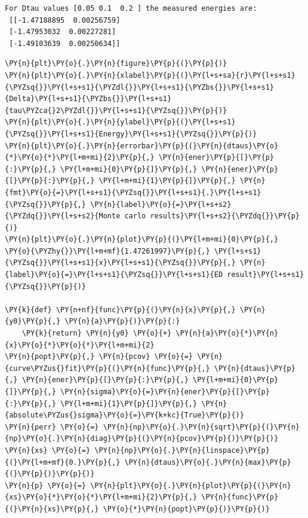     \begin{Verbatim}[commandchars=\\\{\}]
For Dtau values [0.05 0.1  0.2 ] the measured energies are:
 [[-1.47188895  0.00256759]
 [-1.47953032  0.00227281]
 [-1.49103639  0.00250634]]
    \end{Verbatim}

    \begin{tcolorbox}[breakable, size=fbox, boxrule=1pt, pad at break*=1mm,colback=cellbackground, colframe=cellborder]
\begin{Verbatim}[commandchars=\\\{\}]
\PY{n}{plt}\PY{o}{.}\PY{n}{figure}\PY{p}{(}\PY{p}{)}
\PY{n}{plt}\PY{o}{.}\PY{n}{xlabel}\PY{p}{(}\PY{l+s+sa}{r}\PY{l+s+s1}{\PYZsq{}}\PY{l+s+s1}{\PYZdl{}}\PY{l+s+s1}{\PYZbs{}}\PY{l+s+s1}{Delta}\PY{l+s+s1}{\PYZbs{}}\PY{l+s+s1}{tau\PYZca{}2\PYZdl{}}\PY{l+s+s1}{\PYZsq{}}\PY{p}{)}
\PY{n}{plt}\PY{o}{.}\PY{n}{ylabel}\PY{p}{(}\PY{l+s+s1}{\PYZsq{}}\PY{l+s+s1}{Energy}\PY{l+s+s1}{\PYZsq{}}\PY{p}{)}
\PY{n}{plt}\PY{o}{.}\PY{n}{errorbar}\PY{p}{(}\PY{n}{dtaus}\PY{o}{*}\PY{o}{*}\PY{l+m+mi}{2}\PY{p}{,} \PY{n}{ener}\PY{p}{[}\PY{p}{:}\PY{p}{,} \PY{l+m+mi}{0}\PY{p}{]}\PY{p}{,} \PY{n}{ener}\PY{p}{[}\PY{p}{:}\PY{p}{,} \PY{l+m+mi}{1}\PY{p}{]}\PY{p}{,} \PY{n}{fmt}\PY{o}{=}\PY{l+s+s1}{\PYZsq{}}\PY{l+s+s1}{.}\PY{l+s+s1}{\PYZsq{}}\PY{p}{,} \PY{n}{label}\PY{o}{=}\PY{l+s+s2}{\PYZdq{}}\PY{l+s+s2}{Monte carlo results}\PY{l+s+s2}{\PYZdq{}}\PY{p}{)}
\PY{n}{plt}\PY{o}{.}\PY{n}{plot}\PY{p}{(}\PY{l+m+mi}{0}\PY{p}{,} \PY{o}{\PYZhy{}}\PY{l+m+mf}{1.47261997}\PY{p}{,} \PY{l+s+s1}{\PYZsq{}}\PY{l+s+s1}{x}\PY{l+s+s1}{\PYZsq{}}\PY{p}{,} \PY{n}{label}\PY{o}{=}\PY{l+s+s1}{\PYZsq{}}\PY{l+s+s1}{ED result}\PY{l+s+s1}{\PYZsq{}}\PY{p}{)}

\PY{k}{def} \PY{n+nf}{func}\PY{p}{(}\PY{n}{x}\PY{p}{,} \PY{n}{y0}\PY{p}{,} \PY{n}{a}\PY{p}{)}\PY{p}{:}
    \PY{k}{return} \PY{n}{y0} \PY{o}{+} \PY{n}{a}\PY{o}{*}\PY{n}{x}\PY{o}{*}\PY{o}{*}\PY{l+m+mi}{2}
\PY{n}{popt}\PY{p}{,} \PY{n}{pcov} \PY{o}{=} \PY{n}{curve\PYZus{}fit}\PY{p}{(}\PY{n}{func}\PY{p}{,} \PY{n}{dtaus}\PY{p}{,} \PY{n}{ener}\PY{p}{[}\PY{p}{:}\PY{p}{,} \PY{l+m+mi}{0}\PY{p}{]}\PY{p}{,} \PY{n}{sigma}\PY{o}{=}\PY{n}{ener}\PY{p}{[}\PY{p}{:}\PY{p}{,} \PY{l+m+mi}{1}\PY{p}{]}\PY{p}{,} \PY{n}{absolute\PYZus{}sigma}\PY{o}{=}\PY{k+kc}{True}\PY{p}{)}
\PY{n}{perr} \PY{o}{=} \PY{n}{np}\PY{o}{.}\PY{n}{sqrt}\PY{p}{(}\PY{n}{np}\PY{o}{.}\PY{n}{diag}\PY{p}{(}\PY{n}{pcov}\PY{p}{)}\PY{p}{)}
\PY{n}{xs} \PY{o}{=} \PY{n}{np}\PY{o}{.}\PY{n}{linspace}\PY{p}{(}\PY{l+m+mf}{0.}\PY{p}{,} \PY{n}{dtaus}\PY{o}{.}\PY{n}{max}\PY{p}{(}\PY{p}{)}\PY{p}{)}
\PY{n}{p} \PY{o}{=} \PY{n}{plt}\PY{o}{.}\PY{n}{plot}\PY{p}{(}\PY{n}{xs}\PY{o}{*}\PY{o}{*}\PY{l+m+mi}{2}\PY{p}{,} \PY{n}{func}\PY{p}{(}\PY{n}{xs}\PY{p}{,} \PY{o}{*}\PY{n}{popt}\PY{p}{)}\PY{p}{)}


\end{Verbatim}
\end{tcolorbox}
